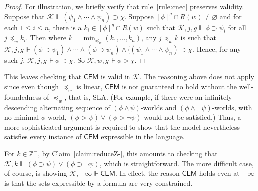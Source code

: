\documentclass[12pt]{article}
\newcommand{\would}{\mathbin{>}}
\newcommand{\then}{\mathbin{\supset}}
\begin{document}
\begin{proof}
For illustration, we briefly verify that rule~\ref{rule:cnec} preserves validity. 
Suppose that $\mathcal{K} \Vdash (\psi_1 \wedge \cdots \wedge \psi_n) \then \chi$. 
Suppose $[\phi]^g \cap R(w) \neq \varnothing$ and for each $1\leq i\leq{n}$, there is a $k_i \in [\phi]^g \cap R(w)$ such that $\mathcal{K},j,g \Vdash \phi \then \psi_i$ for all $j \preceq_{w} k_i$. 
Then where $k = \min_{\preceq_w}(k_1,\dots,k_n)$, any $j \preceq_{w} k$ is such that $\mathcal{K},j,g \Vdash (\phi \then \psi_1) \wedge \cdots \wedge (\phi \then \psi_n) \wedge ((\psi_1 \wedge \cdots \wedge \psi_n) \then \chi$. 
Hence, for any such $j$, $\mathcal{K},j,g \Vdash \phi \then \chi$. 
So $\mathcal{K},w,g \Vdash \phi \would \chi$.
\end{proof}

This leaves checking that $\mathsf{CEM}$ is valid in $\mathcal{K}$. 
The reasoning above does not apply since even though $\preceq_w$ is linear, $\mathsf{CEM}$ is not guaranteed to hold without the well-foundedness of $\preceq_w$, that is, SLA. 
(For example, if there were an infinitely descending alternating sequence of $(\phi \wedge \psi)$-worlds and $(\phi \wedge \neg\psi)$-worlds, with no minimal $\phi$-world, $(\phi \would \psi) \vee (\phi \would \neg\psi)$ would not be satisfied.) 
Thus, a more sophisticated argument is required to show that the model nevertheless satisfies every instance of $\mathsf{CEM}$ expressible in the language. 

For $k \in \mathbb{Z}^-$, by Claim~\ref{claim:reduceZ-}, this amounts to checking that $\mathcal{K},k \Vdash (\phi \then \psi) \vee (\phi \then \neg\psi)$, which is straightforward. 
The more difficult case, of course, is showing $\mathcal{K},-\infty \Vdash \mathsf{CEM}$. 
In effect, the reason $\mathsf{CEM}$ holds even at $-\infty$ is that the sets expressible by a formula are very constrained. 
\end{document}
